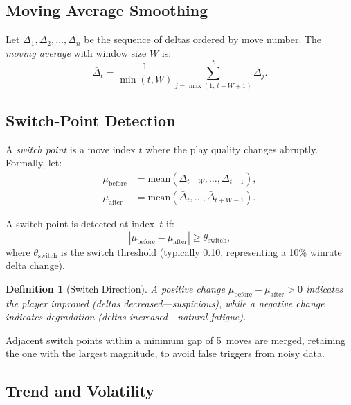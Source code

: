 \documentclass[11pt,a4paper]{article}
\newtheorem{definition}{Definition}
\begin{document}
\subsection{Moving Average Smoothing}

Let $\Delta_1, \Delta_2, \ldots, \Delta_n$ be the sequence of deltas ordered
by move number. The \emph{moving average} with window size $W$ is:
\begin{equation}
    \bar{\Delta}_t = \frac{1}{\min(t, W)} \sum_{j=\max(1,\, t-W+1)}^{t}
    \Delta_j.
    \label{eq:moving_avg}
\end{equation}

\subsection{Switch-Point Detection}

A \emph{switch point} is a move index $t$ where the play quality changes
abruptly. Formally, let:
\begin{align}
    \mu_{\text{before}} &= \text{mean}\!\left(\bar{\Delta}_{t-W}, \ldots,
    \bar{\Delta}_{t-1}\right), \label{eq:mu_before}\\
    \mu_{\text{after}} &= \text{mean}\!\left(\bar{\Delta}_t, \ldots,
    \bar{\Delta}_{t+W-1}\right). \label{eq:mu_after}
\end{align}

A switch point is detected at index~$t$ if:
\begin{equation}
    |\mu_{\text{before}} - \mu_{\text{after}}| \geq \theta_{\text{switch}},
    \label{eq:switch_condition}
\end{equation}
where $\theta_{\text{switch}}$ is the switch threshold (typically 0.10,
representing a 10\% winrate delta change).

\begin{definition}[Switch Direction]
A positive change $\mu_{\text{before}} - \mu_{\text{after}} > 0$ indicates the
player \emph{improved} (deltas decreased---suspicious), while a negative change
indicates \emph{degradation} (deltas increased---natural fatigue).
\end{definition}

Adjacent switch points within a minimum gap of 5~moves are merged, retaining
the one with the largest magnitude, to avoid false triggers from noisy data.

\subsection{Trend and Volatility}
\end{document}
